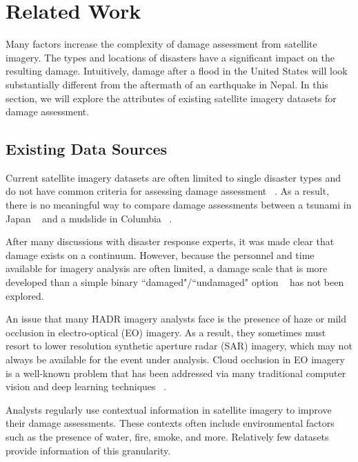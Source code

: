 \documentclass[10pt,twocolumn,letterpaper]{article}
\begin{document}
\section{Related Work}\label{sec:relatedwork}
Many factors  increase the complexity of damage assessment from satellite imagery.
The types and locations of disasters have a significant impact on the resulting damage.
Intuitively, damage after a flood in the United States will look substantially different from the aftermath of an earthquake in Nepal.
In this section, we will explore the attributes of existing satellite imagery datasets for damage assessment.

\subsection{Existing Data Sources}
Current satellite imagery datasets are often limited to single disaster types and do not have common criteria for assessing damage assessment ~\cite{fujitaDamageDetectionAerial2017, chenBenchmarkDatasetAutomatic2018, ColombiaBuildingDamage2017, foulser-piggottUseRemoteSensing2012}.
As a result, there is no meaningful way to compare damage assessments between a tsunami in Japan ~\cite{fujitaDamageDetectionAerial2017} and a mudslide in Columbia ~\cite{ColombiaBuildingDamage2017}.

After many discussions with disaster response experts, it was made clear that damage exists on a continuum. However, because the personnel and time available for imagery analysis are often limited, a damage scale that is more developed than a simple binary ``damaged"/``undamaged" option ~\cite{fujitaDamageDetectionAerial2017} has not been explored.

An issue that many HADR imagery analysts face is the presence of haze or mild occlusion in electro-optical (EO) imagery.
As a result, they sometimes must resort to lower resolution synthetic aperture radar (SAR) imagery, which may not always be available for the event under analysis.
Cloud occlusion in EO imagery is a well-known problem that has been addressed via many traditional computer vision and deep learning techniques ~\cite{mitchellFilteringRemoveCloud1977, baiCloudDetectionHighResolution2016, zhuRemoteSensingImaging2017}.

Analysts regularly use contextual information in satellite imagery to improve their damage assessments. These contexts often include environmental factors such as the presence of water, fire, smoke, and more.  Relatively few datasets ~\cite{demirDeepGlobe2018Challenge2018, giglioAnalysisDailyMonthly2013}  provide information of this granularity.
\end{document}
